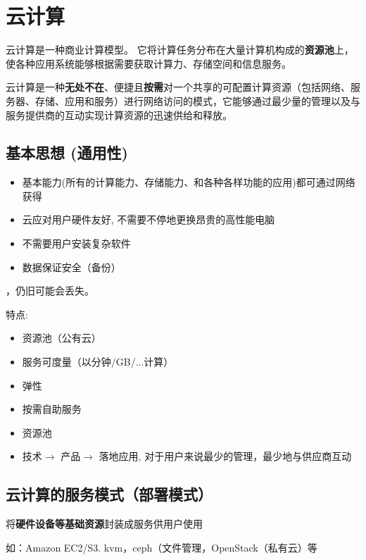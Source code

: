 \section{云计算}

\begin{definition}[云计算]
    云计算是一种商业计算模型。 它将计算任务分布在大量计算机构成的\textbf{资源池}上，使各种应用系统能够根据需要获取计算力、存储空间和信息服务。 

    云计算是一种\textbf{无处不在}、便捷且\textbf{按需}对一个共享的可配置计算资源（包括网络、服务器、存储、应用和服务）进行网络访问的模式，它能够通过最少量的管理以及与服务提供商的互动实现计算资源的迅速供给和释放。 
\end{definition}

\subsection{基本思想 (通用性)}

\begin{itemize}
    \item 基本能力(所有的计算能力、存储能力、和各种各样功能的应用)都可通过网络获得
    \item 云应对用户硬件友好, 不需要不停地更换昂贵的高性能电脑
    \item 不需要用户安装复杂软件
    \item 数据保证安全（备份）
\end{itemize}

，仍旧可能会丢失。

特点:
\begin{itemize}
    \item 资源池（公有云）
    \item 服务可度量（以分钟/GB/...计算）
    \item 弹性
    \item 按需自助服务
    \item 资源池
    \item 技术$\rightarrow$ 产品$\rightarrow$ 落地应用, 对于用户来说最少的管理，最少地与供应商互动
\end{itemize}

\subsection{云计算的服务模式（部署模式）}

\begin{definition}
    将\textbf{硬件设备等基础资源}封装成服务供用户使用

    如：Amazon EC2/S3. kvm，ceph（文件管理，OpenStack（私有云）等
\end{definition}

